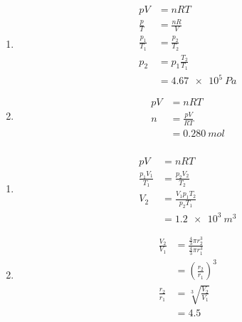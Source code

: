 \documentclass{article}
\begin{document}
\subsubsection{}

\begin{enumerate}
  \item

        \begin{align*}
          p V             & = n R T               \\
          \frac{p}{T}     & = \frac{n R}{V}       \\
          \frac{p_1}{T_1} & = \frac{p_2}{T_2}     \\
          p_2             & = p_1 \frac{T_2}{T_1} \\
                          & = \qty{4.67e5}{Pa}
        \end{align*}

  \item

        \begin{align*}
          p V & = n R T            \\
          n   & = \frac{p V}{R T}  \\
              & = \qty{0.280}{mol}
        \end{align*}
\end{enumerate}

\subsubsection{}

\begin{enumerate}
  \item

        \begin{align*}
          p V                 & = n R T                       \\
          \frac{p_1 V_1}{T_1} & = \frac{p_2 V_2}{T_2}         \\
          V_2                 & = \frac{V_1 p_1 T_2}{p_2 T_1} \\
                              & = \qty{1.2e3}{m^3}
        \end{align*}

  \item

        \begin{align*}
          \frac{V_2}{V_1} & = \frac{\frac{4}{3} \pi r_2^3}{\frac{4}{3} \pi r_1^3} \\
                          & = \left( \frac{r_2}{r_1} \right)^3                    \\
          \frac{r_2}{r_1} & = \sqrt[3]{\frac{V_2}{V_1}}                           \\
                          & = 4.5
        \end{align*}
\end{enumerate}
\end{document}

